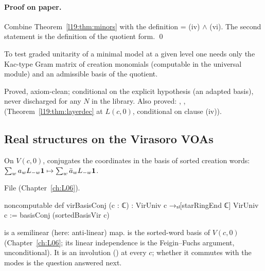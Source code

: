 \paragraph{Proof on paper.} Combine Theorem~\ref{l19:thm:minors} with the definition
 = (iv) $\wedge$ (vi). The second statement is the definition of the quotient form.
\qed

\begin{physics}
To test graded unitarity of a minimal model at a given level one needs only the Kac-type Gram matrix
of creation monomials (computable in the universal module) and an admissible basis of the quotient.
\end{physics}

\begin{status}
Proved, axiom-clean; conditional on the explicit hypothesis  (an adapted basis), never
discharged for any $N$ in the library. Also proved: ,
,  (Theorem~\ref{l19:thm:layerdec} at $L(c,0)$,
conditional on clause (iv)).
\end{status}

\subsection{Real structures on the Virasoro VOAs}\label{l19:sec:virreal}

\begin{definition}\label{l19:def:virconj}
On $V(c,0)$,  conjugates the coordinates in the basis of sorted creation words:
$\sum_w a_wL_{-w}\mathbf{1}\mapsto\sum_w\bar a_wL_{-w}\mathbf{1}$.
\end{definition}

\noindent File  (Chapter~\ref{ch:L06}).
\begin{leancode}
noncomputable def virBasisConj (c : ℂ) : VirUniv c →ₛₗ[starRingEnd ℂ] VirUniv c :=
  basisConj (sortedBasisVir c)
\end{leancode}

\begin{dictionary}
 is a semilinear (here: anti-linear) map.  is the
sorted-word basis of $V(c,0)$ (Chapter~\ref{ch:L06}; its linear independence is the Feigin--Fuchs
argument, unconditional). It is an involution () at every $c$; whether it
commutes with the modes is the question answered next.
\end{dictionary}

